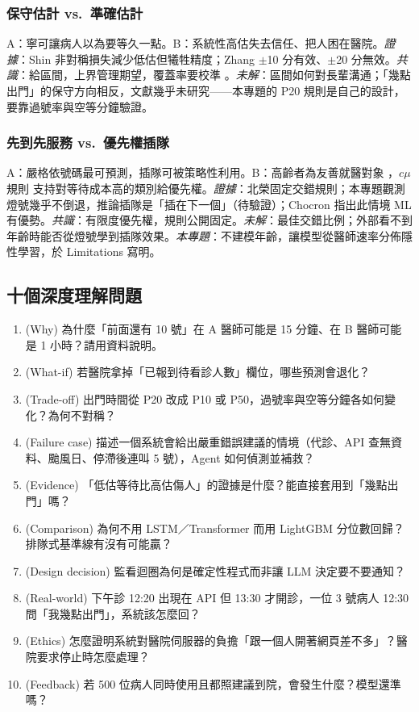 \documentclass[11pt,twocolumn]{article}
\begin{document}
\subsubsection{保守估計 vs.\ 準確估計}
A：寧可讓病人以為要等久一點。B：系統性高估失去信任、把人困在醫院。\textit{證據}：Shin \cite{shin2024} 非對稱損失減少低估但犧牲精度；Zhang \cite{zhang2023} $\pm$10 分有效、$\pm$20 分無效。\textit{共識}：給區間，上界管理期望，覆蓋率要校準 \cite{shahbazi2026}。\textit{未解}：區間如何對長輩溝通；「幾點出門」的保守方向相反，文獻幾乎未研究——本專題的 P20 規則是自己的設計，要靠過號率與空等分鐘驗證。

\subsubsection{先到先服務 vs.\ 優先權插隊}
A：嚴格依號碼最可預測，插隊可被策略性利用。B：高齡者為友善就醫對象 \cite{vghtpe2025,vghtcnotice}，$c\mu$ 規則 \cite{cox1961} 支持對等待成本高的類別給優先權。\textit{證據}：北榮固定交錯規則；本專題觀測燈號幾乎不倒退，推論插隊是「插在下一個」（待驗證）；Chocron \cite{chocron2022} 指出此情境 ML 有優勢。\textit{共識}：有限度優先權，規則公開固定。\textit{未解}：最佳交錯比例；外部看不到年齡時能否從燈號學到插隊效果。\textit{本專題}：不建模年齡，讓模型從醫師速率分佈隱性學習，於 Limitations 寫明。

\subsection{十個深度理解問題}
\begin{enumerate}[label=Q\arabic*.,leftmargin=2.2em]
\item (Why) 為什麼「前面還有 10 號」在 A 醫師可能是 15 分鐘、在 B 醫師可能是 1 小時？請用資料說明。
\item (What-if) 若醫院拿掉「已報到待看診人數」欄位，哪些預測會退化？
\item (Trade-off) 出門時間從 P20 改成 P10 或 P50，過號率與空等分鐘各如何變化？為何不對稱？
\item (Failure case) 描述一個系統會給出嚴重錯誤建議的情境（代診、API 查無資料、颱風日、停滯後連叫 5 號），Agent 如何偵測並補救？
\item (Evidence) 「低估等待比高估傷人」的證據是什麼？能直接套用到「幾點出門」嗎？
\item (Comparison) 為何不用 LSTM／Transformer 而用 LightGBM 分位數回歸？排隊式基準線有沒有可能贏？
\item (Design decision) 監看迴圈為何是確定性程式而非讓 LLM 決定要不要通知？
\item (Real-world) 下午診 12:20 出現在 API 但 13:30 才開診，一位 3 號病人 12:30 問「我幾點出門」，系統該怎麼回？
\item (Ethics) 怎麼證明系統對醫院伺服器的負擔「跟一個人開著網頁差不多」？醫院要求停止時怎麼處理？
\item (Feedback) 若 500 位病人同時使用且都照建議到院，會發生什麼？模型還準嗎？
\end{enumerate}
\end{document}

